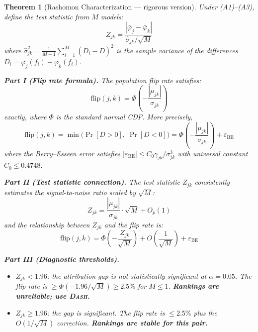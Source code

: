 \documentclass{article}
\newcommand{\DASH}{\textsc{Dash}}
\newtheorem{theorem}{Theorem}
\begin{document}
\begin{theorem}[Rashomon Characterization --- rigorous version]
\label{thm:testable}
Under (A1)--(A3), define the test statistic from $M$ models:
\[
    Z_{jk} = \frac{|\bar\varphi_j - \bar\varphi_k|}
    {\hat\sigma_{jk}/\sqrt{M}}
\]
where $\hat\sigma_{jk}^2 = \frac{1}{M-1}\sum_{i=1}^M
(D_i - \bar{D})^2$ is the sample variance of the differences
$D_i = \varphi_j(f_i) - \varphi_k(f_i)$.

\textbf{Part I (Flip rate formula).}
The population flip rate satisfies:
\begin{equation}
\label{eq:flip-exact}
    \text{flip}(j,k) = \Phi\!\left(-\frac{|\mu_{jk}|}{\sigma_{jk}}\right)
\end{equation}
exactly, where $\Phi$ is the standard normal CDF. More precisely,
\[
    \text{flip}(j,k) = \min\!\big(\Pr[D > 0],\; \Pr[D < 0]\big)
    = \Phi\!\left(-\frac{|\mu_{jk}|}{\sigma_{jk}}\right)
    + \varepsilon_{\text{BE}}
\]
where the Berry--Esseen error satisfies
$|\varepsilon_{\text{BE}}| \leq C_0 \gamma_{jk} / \sigma_{jk}^3$
with universal constant $C_0 \leq 0.4748$.

\textbf{Part II (Test statistic connection).}
The test statistic $Z_{jk}$ consistently estimates the signal-to-noise
ratio scaled by $\sqrt{M}$:
\[
    Z_{jk} = \frac{|\mu_{jk}|}{\sigma_{jk}} \cdot \sqrt{M}
    + O_p(1)
\]
and the relationship between $Z_{jk}$ and the flip rate is:
\begin{equation}
\label{eq:flip-z}
    \text{flip}(j,k) = \Phi\!\left(-\frac{Z_{jk}}{\sqrt{M}}\right)
    + O\!\left(\frac{1}{\sqrt{M}}\right)
    + \varepsilon_{\text{BE}}
\end{equation}

\textbf{Part III (Diagnostic thresholds).}
\begin{itemize}
    \item $Z_{jk} < 1.96$: the attribution gap is not statistically
      significant at $\alpha = 0.05$. The flip rate is
      $\geq \Phi(-1.96/\sqrt{M}) \geq 2.5\%$ for $M \leq 1$.
      \textbf{Rankings are unreliable; use \DASH{}.}
    \item $Z_{jk} \geq 1.96$: the gap is significant. The flip rate is
      $\leq 2.5\%$ plus the $O(1/\sqrt{M})$ correction.
      \textbf{Rankings are stable for this pair.}
\end{itemize}
\end{theorem}
\end{document}
